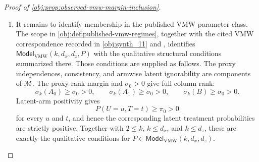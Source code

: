 \begin{proof}[Proof of \cref{obj:prop:observed-vmw-margin-inclusion}]
\begin{enumerate}
\item It remains to identify membership in the published VMW parameter class.  The scope in \cref{obj:def:published-vmw-regimes}, together with the cited VMW correspondence recorded in \cref{obj:synth_11} and \citep{VirkMazaheriWu2026}, identifies \(\mathsf{Model}_{\mathrm{VMW}}(k,d_x,d_z,P)\) with the qualitative structural conditions summarized there.  Those conditions are supplied as follows.  The proxy independences, consistency, and armwise latent ignorability are components of \(\mathcal M\).  The proxy-rank margin and \(\sigma_0>0\) give full column rank:
\[
\sigma_k(A_0)\ge\sigma_0>0,\qquad
\sigma_k(A_1)\ge\sigma_0>0,\qquad
\sigma_k(B)\ge\sigma_0>0.
\]
Latent-arm positivity gives
\[
P(U=u,T=t)\ge\pi_0>0
\]
for every \(u\) and \(t\), and hence the corresponding latent treatment probabilities are strictly positive.  Together with \(2\le k\), \(k\le d_x\), and \(k\le d_z\), these are exactly the qualitative conditions for \(P\in\mathsf{Model}_{\mathrm{VMW}}(k,d_x,d_z)\).
\end{enumerate}
\end{proof}

